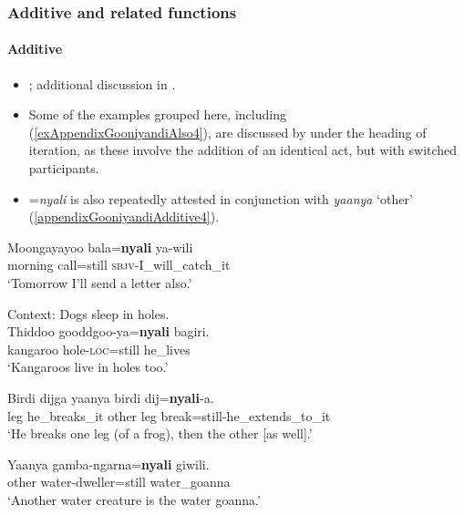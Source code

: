 \subsubsection{Additive and related functions}
\paragraph{Additive}\label{appendixGooniyandiAdditive}
\begin{itemize}
	\item \textcite[460–462]{McGregor1990}; additional discussion in \textcite{SchultzeBerndt2002}.
	\item Some of the examples grouped here, including (\ref{exAppendixGooniyandiAlso4}), are discussed by \textcite{McGregor1990} under the heading of iteration, as these involve the addition of an identical act, but with switched participants.
	\item =\textit{nyali} is also repeatedly attested in conjunction with \textit{yaanya} \lq other\rq{ }(\ref{appendixGooniyandiAdditive4}).
\end{itemize}

\begin{exe}
	\ex \gll Moongayayoo bala=\textbf{nyali} ya-wili\\
	morning call=still \textsc{sbjv}-I\_will\_catch\_it\\
	\glt \lq Tomorrow I’ll send a letter also.' \parencite[461]{McGregor1990}

	\ex Context: Dogs sleep in holes.\\
	\gll Thiddoo gooddgoo-ya=\textbf{nyali} bagiri.\\
	kangaroo hole-\textsc{loc}=still he\_lives\\
	\glt \lq Kangaroos live in holes too.'  \parencite[462]{McGregor1990}

	\ex \label{exAppendixGooniyandiAlso4}
	\gll Birdi dijga yaanya birdi dij=\textbf{nyali}-a.\\
	leg he\_breaks\_it other leg break=still-he\_extends\_to\_it\\
	\glt \lq He breaks one leg (of a frog), then the other [as well].\rq{ }\parencite[461]{McGregor1990}

	\ex \label{appendixGooniyandiAdditive4}
	\gll Yaanya gamba-ngarna=\textbf{nyali} giwili.\\
	other water-dweller=still water\_goanna\\
	\glt \lq Another water creature is the water goanna.' \parencite[232]{McGregor1990}
\end{exe}

